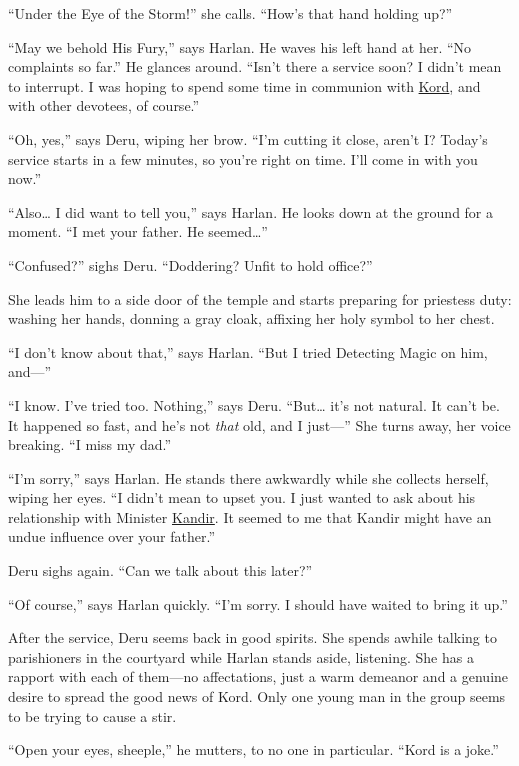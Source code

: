 \documentclass[smalldemyvopaper,11pt,twoside,onecolumn,openright,extrafontsizes]{memoir}
\begin{document}
``Under the Eye of the Storm!'' she calls. ``How's that hand holding
up?''

``May we behold His Fury,'' says Harlan. He waves his left hand at her.
``No complaints so far.'' He glances around. ``Isn't there a service
soon? I didn't mean to interrupt. I was hoping to spend some time in
communion with \href{/characters/kord/}{Kord}, and with other devotees,
of course.''

``Oh, yes,'' says Deru, wiping her brow. ``I'm cutting it close, aren't
I? Today's service starts in a few minutes, so you're right on time.
I'll come in with you now.''

``Also\ldots{} I did want to tell you,'' says Harlan. He looks down at
the ground for a moment. ``I met your father. He seemed\ldots{}''

``Confused?'' sighs Deru. ``Doddering? Unfit to hold office?''

She leads him to a side door of the temple and starts preparing for
priestess duty: washing her hands, donning a gray cloak, affixing her
holy symbol to her chest.

``I don't know about that,'' says Harlan. ``But I tried Detecting Magic
on him, and---''

``I know. I've tried too. Nothing,'' says Deru. ``But\ldots{} it's not
natural. It can't be. It happened so fast, and he's not \emph{that} old,
and I just---'' She turns away, her voice breaking. ``I miss my dad.''

``I'm sorry,'' says Harlan. He stands there awkwardly while she collects
herself, wiping her eyes. ``I didn't mean to upset you. I just wanted to
ask about his relationship with Minister
\href{/characters/kandir/}{Kandir}. It seemed to me that Kandir might
have an undue influence over your father.''

Deru sighs again. ``Can we talk about this later?''

``Of course,'' says Harlan quickly. ``I'm sorry. I should have waited to
bring it up.''

After the service, Deru seems back in good spirits. She spends awhile
talking to parishioners in the courtyard while Harlan stands aside,
listening. She has a rapport with each of them---no affectations, just a
warm demeanor and a genuine desire to spread the good news of Kord. Only
one young man in the group seems to be trying to cause a stir.

``Open your eyes, sheeple,'' he mutters, to no one in particular. ``Kord
is a joke.''
\end{document}
